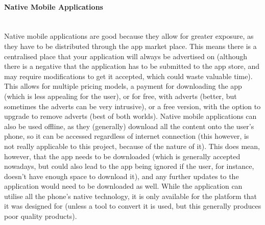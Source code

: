 \paragraph{Native Mobile Applications}\ \\
Native mobile applications are good because they allow for greater exposure, as they have to be distributed through the app market place. This means there is a centralised place that your application will always be advertised on (although there is a negative that the application has to be submitted to the app store, and may require modifications to get it accepted, which could waste valuable time). This allows for multiple pricing models, a payment for downloading the app (which is less appealing for the user), or for free, with adverts (better, but sometimes the adverts can be very intrusive), or a free version, with the option to upgrade to remove adverts (best of both worlds). Native mobile applications can also be used offline, as they (generally) download all the content onto the user's phone, so it can be accessed regardless of internet connection (this however, is not really applicable to this project, because of the nature of it). This does mean, however, that the app needs to be downloaded (which is generally accepted nowadays, but could also lead to the app being ignored if the user, for instance, doesn't have enough space to download it), and any further updates to the application would need to be downloaded as well. While the application can utilise all the phone's native technology, it is only available for the platform that it was designed for (unless a tool to convert it is used, but this generally produces poor quality products). 
